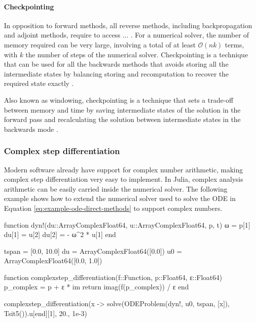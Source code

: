 
\paragraph{Checkpointing}
\label{section:checkpointing}

In opposition to forward methods, all reverse methods, including backpropagation and adjoint methods, require to access ... . 
For a numerical solver, the number of memory required can be very large, involving a total of at least $\mathcal O(nk)$ terms, with $k$ the number of steps of the numerical solver. 
Checkpointing is a technique that can be used for all the backwards methods that avoids storing all the intermediate states by balancing  storing and recomputation to recover the required state exactly \cite{Griewank:2008kh}.

Also known as windowing, checkpointing is a technique that sets a trade-off between memory and time by saving intermediate states of the solution in the forward pass and recalculating the solution between intermediate states in the backwards mode \cite{Griewank:2008kh, Checkpoiting_2023}. 
    



\subsubsection{Complex step differentiation}
\label{section:software-complex-step}

Modern software already have support for complex number arithmetic, making complex step differentiation very easy to implement.
In Julia, complex analysis arithmetic can be easily carried inside the numerical solver.
The following example shows how to extend the numerical solver used to solve the ODE in Equation \eqref{eq:example-ode-direct-methods} to support complex numbers.
\begin{jllisting}
function dyn!(du::Array{Complex{Float64}}, u::Array{Complex{Float64}}, p, t)
    ω = p[1]
    du[1] = u[2]
    du[2] = - ω^2 * u[1]
end

tspan = [0.0, 10.0]
du = Array{Complex{Float64}}([0.0])
u0 = Array{Complex{Float64}}([0.0, 1.0])

function complexstep_differentiation(f::Function, p::Float64, ε::Float64)
    p_complex = p + ε * im
    return imag(f(p_complex)) / ε
end

complexstep_differentiation(x -> solve(ODEProblem(dyn!, u0, tspan, [x]), Tsit5()).u[end][1], 20., 1e-3)
\end{jllisting}

